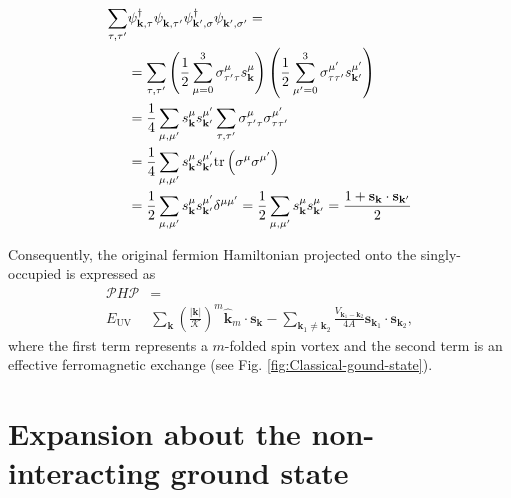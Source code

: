 \documentclass[english,aps,prd,nofootinbib,twocolumn]{revtex4-1}
\begin{document}
\begin{equation}
\begin{split}
\sum_{\tau ,\tau'}&
\psi_{\mathbf{k ,\tau   }}^{\textcolor{black}{\dagger}}
\psi_{\mathbf{k ,\tau'  }}^{\textcolor{white}{\dagger}}\psi_{\mathbf{k',\sigma }}^{\textcolor{black}{\dagger}}
\psi_{\mathbf{k',\sigma'}}^{\textcolor{white}{\dagger}} = \\ &=
\sum_{\tau ,\tau'}
\left(
\frac{1}{2} 
\sum_{\mu =0}^{3} 
\sigma^{\mu }_{\tau'\tau }s^{\mu }_{\mathbf{k }}
\right)
\left(
\frac{1}{2} 
\sum_{\mu'=0}^{3} 
\sigma^{\mu'}_{\tau \tau'}s^{\mu'}_{\mathbf{k'}}
\right) \\ &=
\frac{1}{4}
\sum_{\mu ,\mu'}
s^{\mu }_{\mathbf{k }}
s^{\mu'}_{\mathbf{k'}}
\sum_{\tau ,\tau'}
\sigma^{\mu }_{\tau'\tau }
\sigma^{\mu'}_{\tau \tau'}
 \\ &=
\frac{1}{4}
\sum_{\mu ,\mu'}
s^{\mu }_{\mathbf{k }}
s^{\mu'}_{\mathbf{k'}}
\mathrm{tr}\left( \sigma^{\mu }\sigma^{\mu'} \right)
\\ &=
\frac{1}{2}
\sum_{\mu ,\mu'}
s^{\mu }_{\mathbf{k }}
s^{\mu'}_{\mathbf{k'}}
\delta^{\mu \mu'}
=
\frac{1}{2}
\sum_{\mu ,\mu'}
s^{\mu }_{\mathbf{k }}
s^{\mu }_{\mathbf{k'}}
=
\frac{
1 + 
\mathbf{s}_{\mathbf{k }}
\cdot
\mathbf{s}_{\mathbf{k'}}
}{2}
\end{split}
\end{equation}

Consequently, the original fermion Hamiltonian projected onto the singly-occupied is expressed as
\begin{equation}
\label{eq:Effective-Heisenberg-Hamiltonian}
\begin{split}
\mathcal{P} H \mathcal{P} &= \\
E_{\mathrm{UV} }&
\sum_{\mathbf{k }} \left(\frac{|\mathbf{k}|}{\mathcal{K}}\right)^{m}
\!\! 
\hat{\mathbf{k}}_{m}\!\! \cdot \mathbf{s}_{\mathbf{k }} - 
\sum_{\mathbf{k}_{1} \neq \mathbf{k}_{2}}
\frac{V_{\mathbf{k}_{1}-\mathbf{k}_{2}}}{4A}
\mathbf{s}_{\mathbf{k}_{1}}\!\!
\cdot
\mathbf{s}_{\mathbf{k}_{2}}
,
\end{split}
\end{equation}
where the first term represents a $m$-folded spin vortex and the second term is an effective ferromagnetic exchange (see Fig. \ref{fig:Classical-gound-state}). 

\section{Expansion about the non-interacting ground state}
\end{document}

